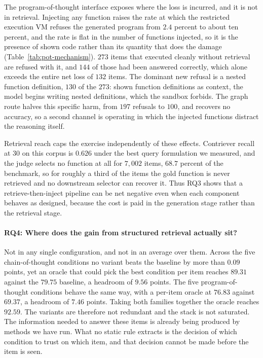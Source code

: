 The program-of-thought interface exposes where the loss is incurred, and it is not in retrieval.
Injecting any function raises the rate at which the restricted execution VM refuses the generated
program from $2.4$ percent to about ten percent, and the rate is flat in the number of functions
injected, so it is the presence of shown code rather than its quantity that does the damage
(Table~\ref{tab:pot-mechanism}). $273$ items that executed cleanly without retrieval are refused
with it, and $144$ of those had been answered correctly, which alone exceeds the entire net loss
of $132$ items. The dominant new refusal is a nested function definition, $130$ of the $273$:
shown function definitions as context, the model begins writing nested definitions, which the
sandbox forbids. The graph route halves this specific harm, from $197$ refusals to $100$, and
recovers no accuracy, so a second channel is operating in which the injected functions distract
the reasoning itself.

Retrieval reach caps the exercise independently of these effects. Contriever recall at $30$ on
this corpus is $0.626$ under the best query formulation we measured, and the judge selects no
function at all for $7{,}002$ items, $68.7$ percent of the benchmark, so for roughly a third of
the items the gold function is never retrieved and no downstream selector can recover it. Thus
RQ3 shows that a retrieve-then-inject pipeline can be net negative even when each component
behaves as designed, because the cost is paid in the generation stage rather than the retrieval
stage.

\paragraph{RQ4: Where does the gain from structured retrieval actually sit?}
Not in any single configuration, and not in an average over them. Across the five
chain-of-thought conditions no variant beats the baseline by more than $0.09$ points, yet an oracle
that could pick the best condition per item reaches $89.31$ against the $79.75$ baseline, a headroom of
$9.56$ points. The five program-of-thought conditions behave the same way, with a per-item oracle at
$76.83$ against $69.37$, a headroom of $7.46$ points. Taking both families together the oracle
reaches $92.59$. The variants are therefore not redundant and the stack is not saturated. The
information needed to answer these items is already being produced by methods we have run. What
no static rule extracts is the decision of which condition to trust on which item, and that decision
cannot be made before the item is seen.

